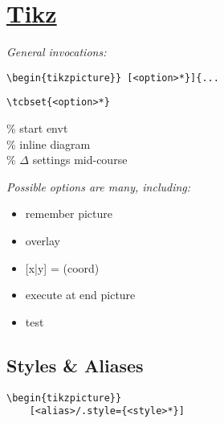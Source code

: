 \section{\href{http://mirrors.ctan.org/graphics/pgf/base/doc/pgfmanual.pdf}{Tikz} }

\textit{General invocations:}\\
\begin{minipage}{6.5cm}\begin{lstlisting}
\begin{tikzpicture}} [<option>*}]{... 
\end{lstlisting}\end{minipage}
\begin{minipage}{6.5cm}\begin{lstlisting}
\tcbset{<option>*} 
\end{lstlisting}\end{minipage}
 \% start envt \\
 \% inline diagram \\
 \% $\Delta$ settings mid-course

\textit{Possible options are many, including: } 
{\scriptsize \begin{multicols}{2}
\begin{itemize}
    \item remember picture
    \item overlay
    \item {[x|y]} = (coord)
    \item execute at end picture
    \item test
\end{itemize}
\end{multicols}}


\subsection*{Styles \& Aliases}

\begin{minipage}{6.5cm}\begin{lstlisting}
\begin{tikzpicture}} 
    [<alias>/.style={<style>*}] 
\end{lstlisting}\end{minipage}

